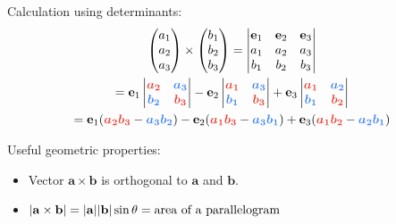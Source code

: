 \begin{multicols}{2}
{        Calculation using determinants:
        \begin{gather*}
                \begin{pmatrix}
                    a_1 \\
                    a_2 \\
                    a_3
                \end{pmatrix}
                \times
                \begin{pmatrix}
                    b_1 \\
                    b_2 \\
                    b_3
                \end{pmatrix}
                =
                \begin{vmatrix}
                    \mathbf{e}_1 & \mathbf{e}_2 & \mathbf{e}_3 \\
                    a_1          & a_2          & a_3          \\
                    b_1          & b_2          & b_3
                \end{vmatrix}
            \\
                =
                \mathbf{e}_1
                \begin{vmatrix}
                    \memphR{a_2} & \memphB{a_3} \\
                    \memphB{b_2} & \memphR{b_3}
                \end{vmatrix}
                -
                \mathbf{e}_2
                \begin{vmatrix}
                    \memphR{a_1} & \memphB{a_3} \\
                    \memphB{b_1} & \memphR{b_3}
                \end{vmatrix}
                +
                \mathbf{e}_3
                \begin{vmatrix}
                    \memphR{a_1} & \memphB{a_2} \\
                    \memphB{b_1} & \memphR{b_2}
                \end{vmatrix}
            \\
                = \mathbf{e}_1 \parens*{\memphR{a_2 b_3} - \memphB{a_3 b_2}}
                - \mathbf{e}_2 \parens*{\memphR{a_1 b_3} - \memphB{a_3 b_1}}
                + \mathbf{e}_3 \parens*{\memphR{a_1 b_2} - \memphB{a_2 b_1}}
        \end{gather*}

        Useful geometric properties:
        \begin{itemize}
            \item Vector $\mathbf{a} \times \mathbf{b}$ is orthogonal to $\mathbf{a}$ and $\mathbf{b}$.
            \item $\abs*{\mathbf{a} \times \mathbf{b}} = \abs*{\mathbf{a}} \abs*{\mathbf{b}} \sin{\theta} = \text{area of a parallelogram}$
        \end{itemize}

}
\end{multicols}
